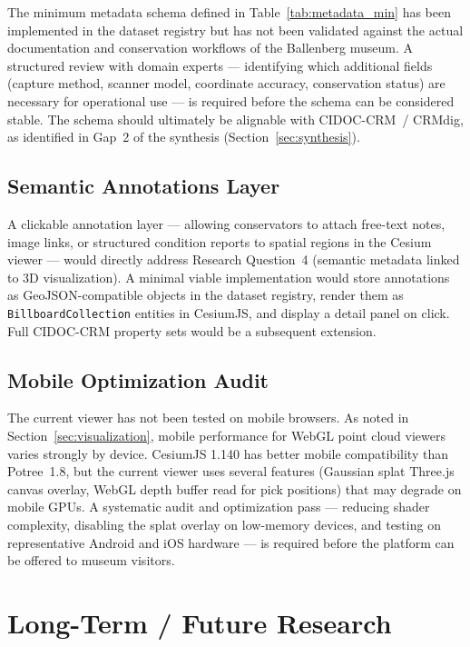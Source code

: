The minimum metadata schema defined in Table~\ref{tab:metadata_min} has been
implemented in the dataset registry but has not been validated against the
actual documentation and conservation workflows of the Ballenberg museum. A
structured review with domain experts — identifying which additional fields
(capture method, scanner model, coordinate accuracy, conservation status) are
necessary for operational use — is required before the schema can be
considered stable. The schema should ultimately be alignable with
CIDOC-CRM~/ CRMdig, as identified in Gap~2 of the synthesis
(Section~\ref{sec:synthesis}).

\subsection{Semantic Annotations Layer}

A clickable annotation layer — allowing conservators to attach free-text notes,
image links, or structured condition reports to spatial regions in the Cesium
viewer — would directly address Research Question~4 (semantic metadata linked
to 3D visualization). A minimal viable implementation would store annotations
as GeoJSON-compatible objects in the dataset registry, render them as
\texttt{BillboardCollection} entities in CesiumJS, and display a detail panel
on click. Full CIDOC-CRM property sets would be a subsequent extension.

\subsection{Mobile Optimization Audit}

The current viewer has not been tested on mobile browsers. As noted in
Section~\ref{sec:visualization}, mobile performance for WebGL point cloud
viewers varies strongly by device. CesiumJS 1.140 has better mobile
compatibility than Potree~1.8, but the current viewer uses several features
(Gaussian splat Three.js canvas overlay, WebGL depth buffer read for pick
positions) that may degrade on mobile GPUs. A systematic audit and
optimization pass — reducing shader complexity, disabling the splat overlay
on low-memory devices, and testing on representative Android and iOS hardware
— is required before the platform can be offered to museum visitors.

\section{Long-Term / Future Research}
\label{sec:tasks_future}

